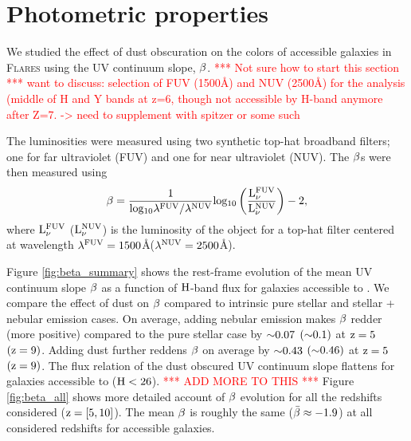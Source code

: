 
\section{Photometric properties}\label{sec:phot}

We studied the effect of dust obscuration on the colors of \euclid accessible galaxies in \textsc{Flares} using the UV continuum slope, $\rm \beta$.  \textcolor{red}{*** Not sure how to start this section *** want to discuss: selection of FUV (1500Å) and NUV (2500Å) for the analysis (middle of H and Y bands at z=6, though not accessible by H-band anymore after Z=7. -> need to supplement with spitzer or some such}

The luminosities were measured using two synthetic top-hat broadband filters; one for far ultraviolet (FUV) and one for near ultraviolet (NUV). The $\rm \beta$s were then measured using
\begin{equation}
\centering
    \mathrm{\beta = \frac{1}{log_{10}{\lambda^{FUV} / \lambda^{NUV}}} log_{10} \left ( \frac{L_{\nu}^{FUV}}{L_{\nu}^{NUV}} \right )  - 2  },
    \label{eqn:beta}
\end{equation}
\noindent
where $\rm L_{\nu}^{FUV}$ ($\rm L_{\nu}^{NUV}$) is the luminosity of the object for a top-hat filter centered at wavelength $\rm \lambda^{FUV} = 1500 $\AA  ($\rm \lambda^{NUV} = 2500 $\AA).

Figure \ref{fig:beta_summary} shows the rest-frame evolution of the mean UV continuum slope $\rm \beta$ as a function of $\rm H$-band flux for galaxies accessible to \euclid. We compare the effect of dust on $\rm \beta$ compared to intrinsic pure stellar and stellar + nebular emission cases. On average, adding nebular emission makes $\rm \beta$ redder (more positive) compared to the pure stellar case by $\rm {\sim}0.07$ $(\rm {\sim}0.1)$ at $\rm z=5$ $(\rm z=9)$. Adding dust further reddens $\rm \beta$ on average by $\rm {\sim}0.43$ $(\rm {\sim}0.46)$ at $\rm z=5$ $(\rm z=9)$. The flux relation of the dust obscured UV continuum slope flattens for galaxies accessible to \euclid \: ($\rm H < 26$). \textcolor{red}{*** ADD MORE TO THIS ***} Figure \ref{fig:beta_all} shows more detailed account of $\rm \beta$ evolution for all the redshifts considered ($\rm z = [5, 10]$). The mean $\rm \beta$ is roughly the same ($\rm \Bar{\beta} \approx -1.9 $) at all considered redshifts for \euclid \: accessible galaxies.


